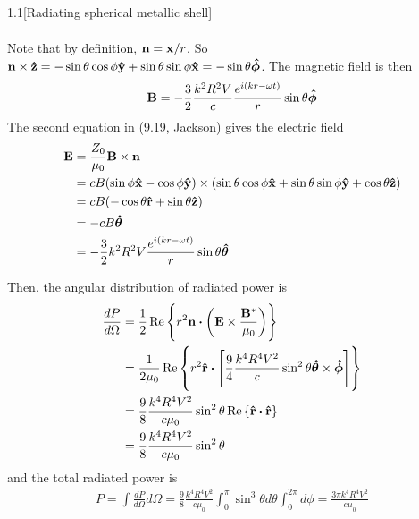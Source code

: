 \documentclass[12pt]{article}
\begin{document}
\begin{problem}{1.1}[Radiating spherical metallic shell]
\begin{solution}
\begin{align}
\end{align}
Note that by definition, $\vb{n}=\vb{x}/r$. So
$\vb{n}\times\vb{\hat{z}}=-\sin\theta\cos\phi\vb{\hat{y}}+\sin\theta\sin\phi\vb{\hat{x}}=-\sin\theta\bm{\hat{\phi}}$.
The magnetic field is then
\begin{equation}
    \vb{B}=-\frac32\frac{k^2R^2V}{c}\frac{e^{i(kr-\omega
    t)}}{r}\sin\theta\bm{\hat{\phi}} 
\end{equation}
The second equation in (9.19, Jackson) gives the electric field
\begin{align}
    \vb{E}&=\frac{Z_0}{\mu_0}\vb{B}\times\vb{n}\notag\\
    &=cB\qty(\sin\phi\vb{\hat{x}}-\cos\phi\vb{\hat{y}})\times\qty(\sin\theta\cos\phi\vb{\hat{x}}+\sin\theta\sin\phi\vb{\hat{y}}+\cos\theta\vb{\hat{z}})\notag\\
    &=cB\qty(-\cos\theta\vb{\hat{r}}+\sin\theta\vb{\hat{z}})\notag\\
    &=-cB\bm{\hat{\theta}}\notag\\
    &=-\frac32k^2R^2V\frac{e^{i(kr-\omega t)}}{r}\sin\theta\bm{\hat{\theta}}
\end{align}

Then, the angular distribution of radiated power is
\begin{align}
    \frac{dP}{d\Omega}
    &=\frac12\Re\qty{r^2\vb{n}\vdot\qty(\vb{E}\times\frac{\vb{B}^\ast}{\mu_0})}
        \notag\\
    &=\frac1{2\mu_0}\Re\qty{r^2\rhat\vdot\qty[\frac94\frac{k^4R^4V^2}{c}\sin^2\theta\thetahat\times\phihat]}\notag\\
    &=\frac98\frac{k^4R^4V^2}{c\mu_0}\sin^2\theta\Re\qty{\rhat\vdot\rhat}\notag\\
    &=\frac98\frac{k^4R^4V^2}{c\mu_0}\sin^2\theta
\end{align}
and the total radiated power is
\begin{align}
    P=\int\frac{dP}{d\Omega}d\Omega
    =\frac98\frac{k^4R^4V^2}{c\mu_0}\int_0^\pi\sin^3\theta
    d\theta\int_0^{2\pi}d\phi
    =\frac{3\pi k^4R^4V^2}{c\mu_0}
\end{align}
\end{solution}
\end{problem}
\end{document}

